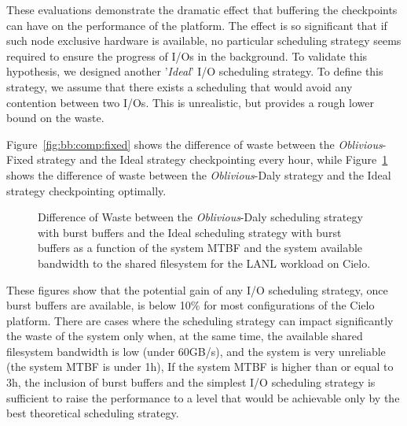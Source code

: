 \documentclass[two]{article}
\newcommand{\nocoop}{\emph{Oblivious}\xspace}
\def\propfixed{\nocoop-Fixed\xspace}
\def\propdaly{\nocoop-Daly\xspace}
\begin{document}
These evaluations demonstrate the dramatic effect that buffering the
checkpoints can have on the performance of the platform. The effect is
so significant that if such node exclusive hardware is available, no particular
scheduling strategy seems required to ensure the progress of I/Os in
the background. To validate this hypothesis, we designed another
'\emph{Ideal}' I/O scheduling strategy. To define this strategy, we
assume that there exists a scheduling that would avoid any contention
between two I/Os. This is unrealistic, but provides a rough lower
bound on the waste.

Figure~\ref{fig:bb:comp:fixed} shows the difference of waste between
the \propfixed strategy and the Ideal strategy checkpointing every
hour, while Figure~\ref{fig:bb:comp:daly} shows the difference of
waste between the \propdaly strategy and the Ideal strategy
checkpointing optimally.

\begin{figure}
  \begin{minipage}{0.49\linewidth}
    \begin{center}
      \resizebox{\linewidth}{!}{}
    \end{center}
    \caption{Difference of Waste between the \propfixed scheduling
      strategy with burst buffers and the Ideal scheduling strategy with
      burst buffers as a function of the system MTBF and the system
      available bandwidth to the shared filesystem for the LANL workload on
      Cielo.\label{fig:bb:comp:fixed}}
  \end{minipage}
  \begin{minipage}{0.49\linewidth}
    \begin{center}
      \resizebox{\linewidth}{!}{}
    \end{center}
    \caption{Difference of Waste between the \propdaly scheduling
      strategy with burst buffers and the Ideal scheduling strategy with
      burst buffers as a function of the system MTBF and the system
      available bandwidth to the shared filesystem for the LANL workload on
      Cielo. \label{fig:bb:comp:daly}}
  \end{minipage}
\end{figure}

These figures show that the potential gain of any I/O scheduling
strategy, once burst buffers are available, is below 10\% for most
configurations of the Cielo platform. There are
cases where the scheduling strategy can impact significantly the waste
of the system only when, at the same time, the
available shared filesystem bandwidth is low (under 60GB/s), and the
system is very unreliable (the system MTBF is under 1h), 
If the system MTBF is higher than or equal to 3h, the inclusion
of burst buffers and the simplest I/O scheduling strategy is
sufficient to raise the performance to a level that would be achievable 
only by the
best theoretical scheduling strategy.
\end{document}
